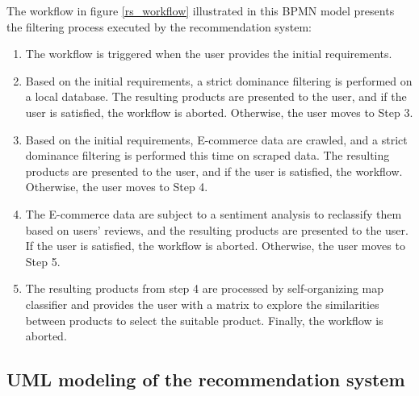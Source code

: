 \documentclass[preprint,3p,onecolumn]{elsarticle}
\begin{document}
\par The workflow in figure \ref{rs_workflow} illustrated in this BPMN model presents the filtering process executed by the recommendation system:
\begin{enumerate}
\item The workflow is triggered when the user provides the initial requirements. 
\item Based on the initial requirements, a strict dominance filtering is performed on a local database. The resulting products are presented to the user, and if the user is satisfied, the workflow is aborted. Otherwise, the user moves to Step 3.
\item Based on the initial requirements, E-commerce data are crawled, and a strict dominance filtering is performed this time on scraped data. The resulting products are presented to the user, and if the user is satisfied, the workflow. Otherwise, the user moves to Step 4.
\item The E-commerce data are subject to a sentiment analysis to reclassify them based on users’ reviews, and the resulting products are presented to the user. If the user is satisfied, the workflow is aborted. Otherwise, the user moves to Step 5.
\item The resulting products from step 4 are processed by self-organizing map classifier and provides the user with a matrix to explore the similarities between products to select the suitable product. Finally, the workflow is aborted.
\end{enumerate}
\subsection{UML modeling of the recommendation system}
\end{document}
